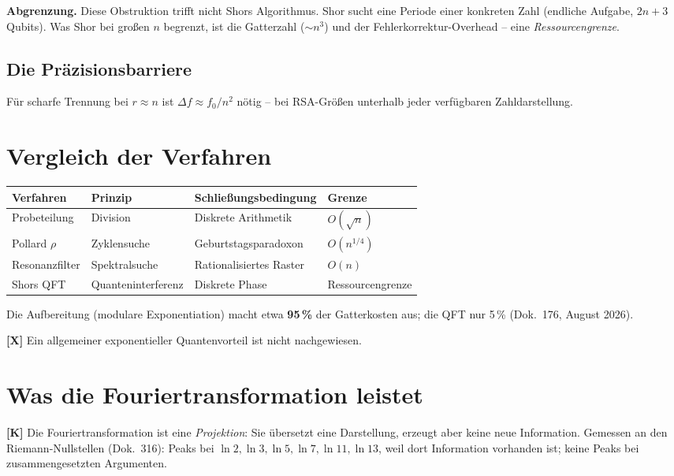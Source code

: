 \textbf{Abgrenzung.} Diese Obstruktion trifft nicht Shors Algorithmus.
Shor sucht eine Periode einer konkreten Zahl (endliche Aufgabe, $2n+3$
Qubits). Was Shor bei großen $n$ begrenzt, ist die Gatterzahl
($\sim n^3$) und der Fehlerkorrektur-Overhead -- eine
\emph{Ressourcengrenze}.

\subsection{Die Präzisionsbarriere}

Für scharfe Trennung bei $r \approx n$ ist $\Delta f \approx f_0/n^2$
nötig -- bei RSA-Größen unterhalb jeder verfügbaren Zahldarstellung.

\section{Vergleich der Verfahren}

\begin{center}
\begin{tabular}{llll}
\toprule
Verfahren & Prinzip & Schließungsbedingung & Grenze \\
\midrule
Probeteilung & Division & Diskrete Arithmetik & $O(\sqrt{n})$ \\
Pollard $\rho$ & Zyklensuche & Geburtstagsparadoxon & $O(n^{1/4})$ \\
Resonanzfilter & Spektralsuche & Rationalisiertes Raster & $O(n)$ \\
Shors QFT & Quanteninterferenz & Diskrete Phase &
  Ressourcengrenze \\
\bottomrule
\end{tabular}
\end{center}

Die Aufbereitung (modulare Exponentiation) macht etwa \textbf{95\,\%}
der Gatterkosten aus; die QFT nur 5\,\% (Dok.~176, August 2026).

\textbf{[X]} Ein allgemeiner exponentieller Quantenvorteil ist nicht
nachgewiesen.

\section{Was die Fouriertransformation leistet}

\textbf{[K]} Die Fouriertransformation ist eine \emph{Projektion}: Sie
übersetzt eine Darstellung, erzeugt aber keine neue Information.
Gemessen an den Riemann-Nullstellen (Dok.~316): Peaks bei
$\ln 2,\ln 3,\ln 5,\ln 7,\ln 11,\ln 13$, weil dort Information
vorhanden ist; keine Peaks bei zusammengesetzten Argumenten.

